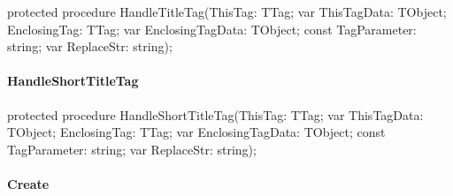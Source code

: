 \documentclass{report}
\newif\ifpdf
\begin{document}
\label{PasDoc_Items.TExternalItem-HandleTitleTag}
\begin{list}{}{
\setlength{\itemindent}{0cm}
\setlength{\listparindent}{0cm}
\setlength{\leftmargin}{\evensidemargin}
\addtolength{\leftmargin}{\tmplength}
\settowidth{\labelsep}{X}
\addtolength{\leftmargin}{\labelsep}
\setlength{\labelwidth}{\tmplength}
}
\item[\textbf{Declaration}\hfill]
\ifpdf
\begin{flushleft}
\fi
\begin{ttfamily}
protected procedure HandleTitleTag(ThisTag: TTag; var ThisTagData: TObject; EnclosingTag: TTag; var EnclosingTagData: TObject; const TagParameter: string; var ReplaceStr: string);\end{ttfamily}

\ifpdf
\end{flushleft}
\fi

\end{list}
\paragraph*{HandleShortTitleTag}\hspace*{\fill}

\label{PasDoc_Items.TExternalItem-HandleShortTitleTag}
\begin{list}{}{
\setlength{\itemindent}{0cm}
\setlength{\listparindent}{0cm}
\setlength{\leftmargin}{\evensidemargin}
\addtolength{\leftmargin}{\tmplength}
\settowidth{\labelsep}{X}
\addtolength{\leftmargin}{\labelsep}
\setlength{\labelwidth}{\tmplength}
}
\item[\textbf{Declaration}\hfill]
\ifpdf
\begin{flushleft}
\fi
\begin{ttfamily}
protected procedure HandleShortTitleTag(ThisTag: TTag; var ThisTagData: TObject; EnclosingTag: TTag; var EnclosingTagData: TObject; const TagParameter: string; var ReplaceStr: string);\end{ttfamily}

\ifpdf
\end{flushleft}
\fi

\end{list}
\paragraph*{Create}\hspace*{\fill}
\end{document}
